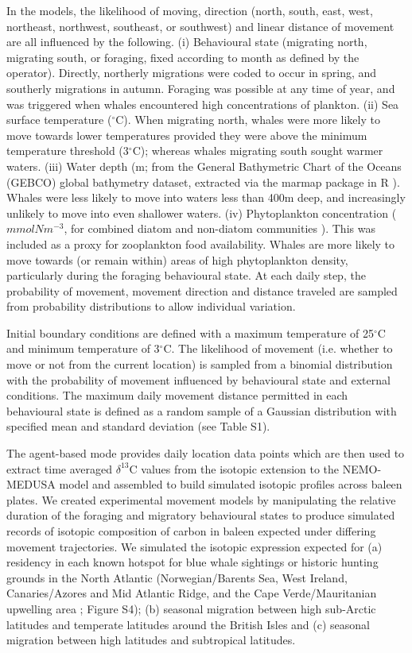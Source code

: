 \documentclass[a4paper,12pt]{article}
\begin{document}
In the models, the likelihood of moving, direction (north, south, east, west, northeast, northwest, southeast, or southwest) and linear distance of movement are all influenced by the following. 
(i) Behavioural state (migrating north, migrating south, or foraging, fixed according to month as defined by the operator).
Directly, northerly migrations were coded to occur in spring, and southerly migrations in autumn.
Foraging was possible at any time of year, and was triggered when whales encountered high concentrations of plankton.
(ii) Sea surface temperature \citep{yool2013medusa} ($^{\circ}$C). 
When migrating north, whales were more likely to move towards lower temperatures provided they were above the minimum temperature threshold (3$^{\circ}$C); whereas whales migrating south sought warmer waters.  
(iii) Water depth (m; from the General Bathymetric Chart of the Oceans (GEBCO) global bathymetry dataset\citep{bathy}, extracted via the marmap package in R \citep{marmap}). 
Whales were less likely to move into waters less than 400m deep, and increasingly unlikely to move into even shallower waters. 
(iv) Phytoplankton concentration ($mmolNm^{-3}$, for combined diatom and non-diatom communities \citep{yool2013medusa}). 
This was included as a proxy for zooplankton food availability. 
Whales are more likely to move towards (or remain within) areas of high phytoplankton density, particularly during the foraging behavioural state. 
At each daily step, the probability of movement, movement direction and distance traveled are sampled from probability distributions to allow individual variation.

Initial boundary conditions are defined with a maximum temperature of 25$^{\circ}$C and minimum temperature of 3$^{\circ}$C. 
The likelihood of movement (i.e. whether to move or not from the current location) is sampled from a binomial distribution with the probability of movement influenced by behavioural state and external conditions. 
The maximum daily movement distance permitted in each behavioural state is defined as a random sample of a Gaussian distribution with specified mean and standard deviation (see Table S1).

The agent-based mode provides daily location data points which are then used to extract time averaged \(\delta^{13}\)C values from the isotopic extension to the NEMO-MEDUSA model and assembled to build simulated isotopic profiles across baleen plates.
We created experimental movement models by manipulating the relative duration of the foraging and migratory behavioural states to produce simulated records of isotopic composition of carbon in baleen expected under differing movement trajectories. 
We simulated the isotopic expression expected for (a) residency in each known hotspot for blue whale sightings or historic hunting grounds in the North Atlantic (Norwegian/Barents Sea, West Ireland, Canaries/Azores and Mid Atlantic Ridge, and the Cape Verde/Mauritanian upwelling area \citep{mcdonald2006biogeographic,reilly2008balaenoptera,sigurjonsson1995life}; Figure S4); (b) seasonal migration between high sub-Arctic latitudes and temperate latitudes around the British Isles and (c) seasonal migration between high latitudes and subtropical latitudes.
\end{document}
